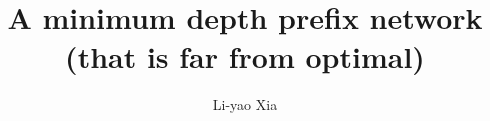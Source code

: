 \documentclass[11pt]{article}
\begin{document}
\title{A minimum depth prefix network (that is far from optimal)}

\author{Li-yao Xia}%

\maketitle



\newpage


\end{document}
